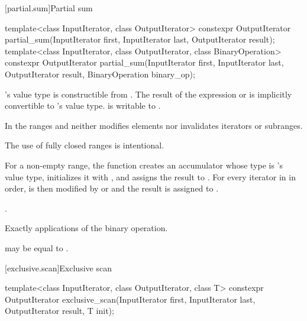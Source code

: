 [partial.sum]{Partial sum}

%
\begin{itemdecl}
template<class InputIterator, class OutputIterator>
  constexpr OutputIterator
    partial_sum(InputIterator first, InputIterator last,
                OutputIterator result);
template<class InputIterator, class OutputIterator, class BinaryOperation>
  constexpr OutputIterator
    partial_sum(InputIterator first, InputIterator last,
                OutputIterator result, BinaryOperation binary_op);
\end{itemdecl}

\begin{itemdescr}
\pnum
\mandates
{}'s value type is constructible from .
The result of the
expression  or 
is implicitly convertible to 's value type.
 is writable to .

\pnum
\expects
In the ranges  and 
 neither modifies elements
nor invalidates iterators or subranges.
\begin{footnote}
The use of fully closed ranges is intentional.
\end{footnote}

\pnum
\effects
For a non-empty range,
the function creates an accumulator 
whose type is 's value type,
initializes it with ,
and assigns the result to .
For every iterator  in  in order,
 is then modified by
 or 
and the result is assigned to .

\pnum
\returns
{}.

\pnum
\complexity
Exactly  applications of the binary operation.

\pnum
\remarks
{} may be equal to .
\end{itemdescr}

[exclusive.scan]{Exclusive scan}

%
\begin{itemdecl}
template<class InputIterator, class OutputIterator, class T>
  constexpr OutputIterator
    exclusive_scan(InputIterator first, InputIterator last,
                   OutputIterator result, T init);
\end{itemdecl}


